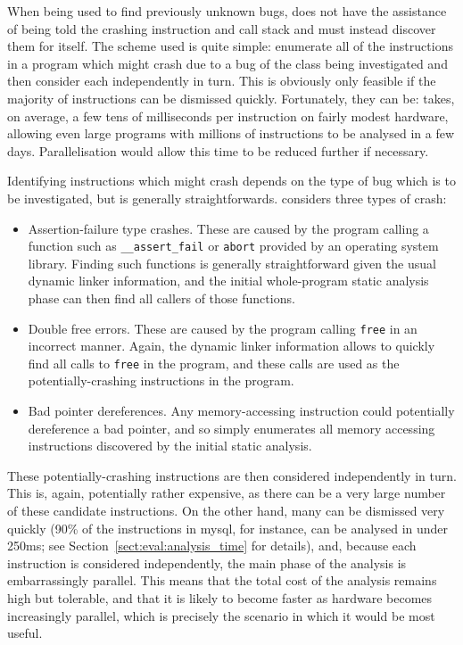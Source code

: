 
When being used to find previously unknown bugs, {\technique} does not
have the assistance of being told the crashing instruction and call
stack and must instead discover them for itself.  The scheme used is
quite simple: enumerate all of the instructions in a program which
might crash due to a bug of the class being investigated and then
consider each independently in turn.  This is obviously only feasible
if the majority of instructions can be dismissed quickly.
Fortunately, they can be: {\implementation} takes, on average, a few
tens of milliseconds per instruction on fairly modest hardware,
allowing even large programs with millions of instructions to be
analysed in a few days.
Parallelisation would allow this time to be reduced further if
necessary.

Identifying instructions which might crash depends on the type of bug
which is to be investigated, but is generally straightforwards.
{\Implementation} considers three types of crash:

\begin{itemize}
\item Assertion-failure type crashes.  These are caused by the program
  calling a function such as \verb|__assert_fail| or \verb|abort|
  provided by an operating system library.  Finding such functions is
  generally straightforward given the usual dynamic linker
  information, and the initial whole-program static analysis phase can
  then find all callers of those functions.
\item Double free errors.  These are caused by the program calling
  \verb|free| in an incorrect manner.  Again, the dynamic linker
  information allows {\implementation} to quickly find all calls to
  \verb|free| in the program, and these calls are used as the
  potentially-crashing instructions in the program.
\item Bad pointer dereferences.  Any memory-accessing instruction
  could potentially dereference a bad pointer, and so
  {\implementation} simply enumerates all memory accessing
  instructions discovered by the initial static analysis.
\end{itemize}

These potentially-crashing instructions are then considered
independently in turn.  This is, again, potentially rather expensive,
as there can be a very large number of these candidate instructions.
On the other hand, many can be dismissed very quickly (90\% of the
instructions in mysql, for instance, can be analysed in under 250ms;
see Section~\ref{sect:eval:analysis_time} for details), and, because
each instruction is considered independently, the main phase of the
analysis is embarrassingly parallel.  This means that the total cost
of the analysis remains high but tolerable, and that it is likely to
become faster as hardware becomes increasingly parallel, which is
precisely the scenario in which it would be most useful.


